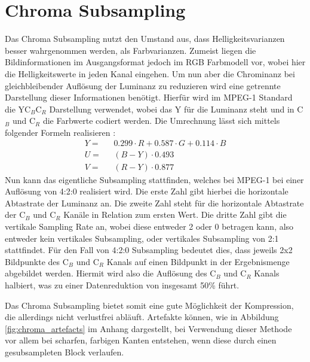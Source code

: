 \section{Chroma Subsampling}

Das Chroma Subsampling nutzt den Umstand aus, dass Helligkeitsvarianzen besser wahrgenommen werden, als Farbvarianzen. Zumeist liegen die Bildinformationen im Ausgangsformat jedoch im RGB Farbmodell vor, wobei hier die Helligkeitswerte in jeden Kanal eingehen. Um nun aber die Chrominanz bei gleichbleibender Auflösung der Luminanz zu reduzieren wird eine getrennte Darstellung dieser Informationen benötigt. Hierfür wird im MPEG-1 Standard die YC$_B$C$_R$ Darstellung verwendet, wobei das Y für die Luminanz steht und in C$_B$ und C$_R$ die Farbwerte codiert werden. Die Umrechnung lässt sich mittels folgender Formeln realisieren \cite{itu-t_recommendation_1995}:
\thickmuskip
\begin{align*}
	Y = & \text{ } 0.299 \cdot R + 0.587 \cdot G + 0.114 \cdot B \\
	U = & \text{ } (B - Y) \cdot 0.493 \\
	V = & \text{ } (R - Y) \cdot 0.877
\end{align*}
Nun kann das eigentliche Subsampling stattfinden, welches bei MPEG-1 bei einer Auflösung von 4:2:0 realisiert wird. Die erste Zahl gibt hierbei die horizontale Abtastrate der Luminanz an. Die zweite Zahl steht für die horizontale Abtastrate der C$_B$ und C$_R$ Kanäle in Relation zum ersten Wert. Die dritte Zahl gibt die vertikale Sampling Rate an, wobei diese entweder 2 oder 0 betragen kann, also entweder kein vertikales Subsampling, oder vertikales Subsampling von 2:1 stattfindet. Für den Fall von 4:2:0 Subsampling bedeutet dies, dass jeweils 2x2 Bildpunkte des C$_B$ und C$_R$ Kanals auf einen Bildpunkt in der Ergebnismenge abgebildet werden. Hiermit wird also die Auflösung des C$_B$ und C$_R$ Kanals halbiert, was zu einer Datenreduktion von insgesamt 50\% führt. \cite{poynton_chroma_????} %

Das Chroma Subsampling bietet somit eine gute Möglichkeit der Kompression, die allerdings nicht verlustfrei abläuft. Artefakte können, wie in Abbildung \ref{fig:chroma_artefacts} im Anhang dargestellt, bei Verwendung dieser Methode vor allem bei scharfen, farbigen Kanten entstehen, wenn diese durch einen gesubsampleten Block verlaufen.



